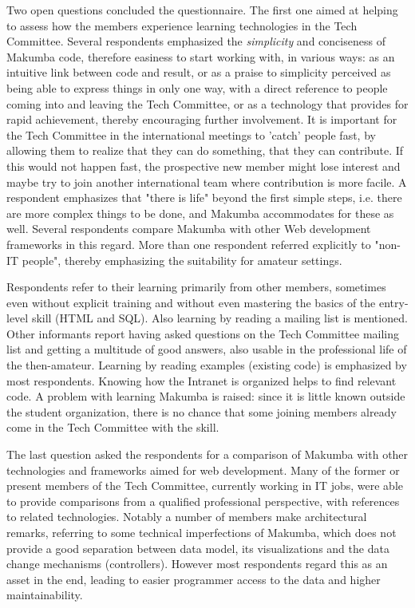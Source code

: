 \documentclass{llncs}
\begin{document}
Two open questions concluded the questionnaire. The first one aimed at helping to assess how the members experience learning technologies in the Tech Committee. Several respondents emphasized the \textit{simplicity} and conciseness of Makumba code, therefore easiness to start working with, in various ways: as an intuitive link between code and result,  or as a praise to simplicity perceived as being able to express things in only one way, with a direct reference to people coming into and leaving the Tech Committee,  or as a technology that provides for rapid achievement, thereby encouraging further involvement. It is important for the Tech Committee in the international meetings to 'catch' people fast, by allowing them to realize that they can do something, that they can contribute. If this would not happen fast, the prospective new member might lose interest and maybe try to join another international team where contribution is more facile. A respondent emphasizes that "there is life" beyond the first simple steps, i.e. there are more complex things to be done, and Makumba accommodates for these as well. Several respondents compare Makumba with other Web development frameworks in this regard. More than one respondent referred explicitly to "non-IT people", thereby emphasizing the suitability for amateur settings.


Respondents refer to their learning primarily from other members, sometimes even without explicit training and without even mastering the basics of the entry-level skill (HTML and SQL). Also learning by reading a mailing list is mentioned. Other informants report having asked questions on the Tech Committee mailing list and getting a multitude of good answers, also usable in the professional life of the then-amateur.
Learning by reading examples (existing code) is emphasized by most respondents. Knowing how the Intranet is organized helps to find relevant code. A problem with learning Makumba is raised: since it is little known outside the student organization, there is no chance that some joining members already come in the Tech Committee with the skill.


The last question asked the respondents for a comparison of Makumba with other technologies and frameworks aimed for web development. Many of the former or present members of the Tech Committee, currently working in IT jobs, were able to provide comparisons from a qualified professional perspective, with references to related technologies. Notably a number of members make architectural remarks, referring to some technical imperfections of Makumba, which does not provide a good separation between data model, its visualizations and the data change mechanisms (controllers). However most respondents regard this as an asset in the end, leading to easier programmer access to the data and higher maintainability.
\end{document}
